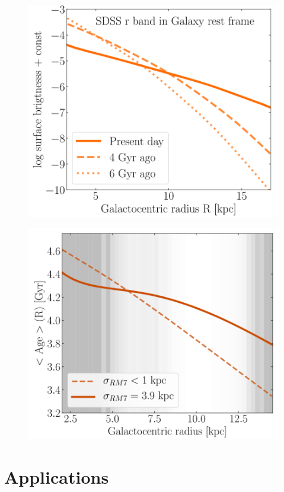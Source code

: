 \documentclass[preprint2]{aastex631}
\begin{document}
\begin{figure}[htb]
    \centering
    \includegraphics[width=\columnwidth]{frankel2019_fig9.png}
    \caption{}
\end{figure}

\begin{figure}[htb]
    \centering
    \includegraphics[width=\columnwidth]{frankel2019_fig12.png}
    \caption{}
\end{figure}

\section{Applications}
\citep{Banerjee+2020}
\end{document}
